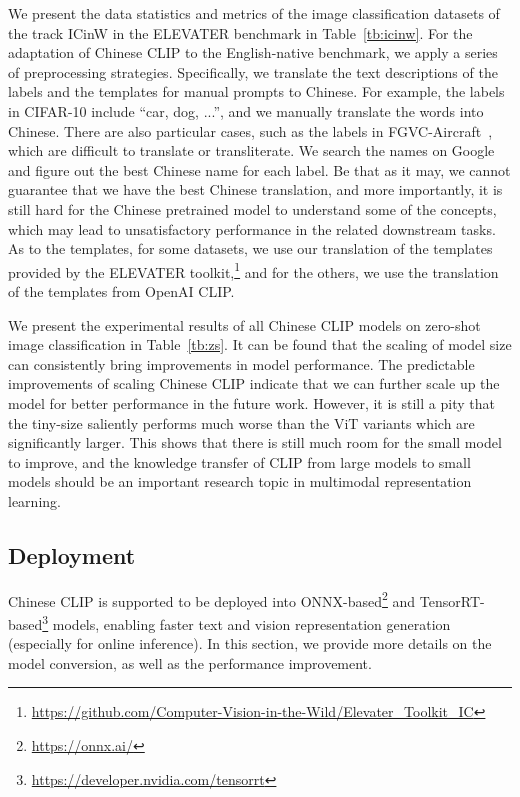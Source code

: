 \documentclass[11pt]{article}
\begin{document}
%
 
We present the data statistics and metrics of the  image classification datasets of the track ICinW in the ELEVATER benchmark in Table~\ref{tb:icinw}. 
For the adaptation of Chinese CLIP to the English-native benchmark, we apply a series of preprocessing strategies. Specifically, we translate the text descriptions of the labels and the templates for manual prompts to Chinese. 
For example, the labels in CIFAR-10 include ``car, dog, ...'', and we manually translate the words into Chinese. 
There are also particular cases, such as the labels in FGVC-Aircraft~\citep{fgvc}, which are difficult to translate or transliterate. 
We search the names on Google and figure out the best Chinese name for each label. 
Be that as it may, we cannot guarantee that we have the best Chinese translation, and more importantly, it is still hard for the Chinese pretrained model to understand some of the concepts, which may lead to unsatisfactory performance in the related downstream tasks. 
As to the templates, for some datasets, we use our translation of the templates provided by the ELEVATER toolkit,\footnote{\url{https://github.com/Computer-Vision-in-the-Wild/Elevater\_Toolkit\_IC}} and for the others, we use the translation of the templates from OpenAI CLIP.

We present the experimental results of all Chinese CLIP models on zero-shot image classification in Table~\ref{tb:zs}. 
It can be found that the scaling of model size can consistently bring improvements in model performance. 
The predictable improvements of scaling Chinese CLIP indicate that we can further scale up the model for better performance in the future work.  
However, it is still a pity that the tiny-size  saliently performs much worse than the ViT variants which are significantly larger. 
This shows that there is still much room for the small model to improve, and the knowledge transfer of CLIP from large models to small models should be an important research topic in multimodal representation learning. 

\subsection{Deployment}
\label{appendix:deployment}

Chinese CLIP is supported to be deployed into ONNX-based\footnote{\url{https://onnx.ai/}} and TensorRT-based\footnote{\url{https://developer.nvidia.com/tensorrt}} models, enabling faster text and vision representation generation (especially for online inference). In this section, we provide more details on the model conversion, as well as the performance improvement. 
\end{document}
